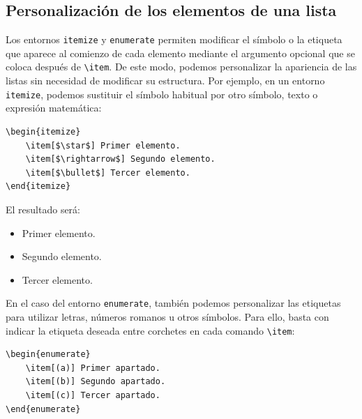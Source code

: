 \documentclass[11pt,a4paper]{article}
\theoremstyle{plain}
\theoremstyle{definition}
\theoremstyle{remark}
\theoremstyle{exercise}
\begin{document}
 
\subsection{Personalización de los elementos de una lista}

Los entornos \texttt{itemize} y \texttt{enumerate} permiten modificar el símbolo o la etiqueta que aparece al comienzo de cada elemento mediante el argumento opcional que se coloca después de \texttt{\textbackslash item}. De este modo, podemos personalizar la apariencia de las listas sin necesidad de modificar su estructura. Por ejemplo, en un entorno \texttt{itemize}, podemos sustituir el símbolo habitual por otro símbolo, texto o expresión matemática:

\begin{lstlisting}
\begin{itemize}
    \item[$\star$] Primer elemento.
    \item[$\rightarrow$] Segundo elemento.
    \item[$\bullet$] Tercer elemento.
\end{itemize}
\end{lstlisting}

\noindent El resultado será:

\begin{paginarecuadrada}
\begin{itemize}
    \item[$\star$] Primer elemento.
    \item[$\rightarrow$] Segundo elemento.
    \item[$\bullet$] Tercer elemento.
\end{itemize}
\end{paginarecuadrada}

En el caso del entorno \texttt{enumerate}, también podemos personalizar las etiquetas para utilizar letras, números romanos u otros símbolos. Para ello, basta con indicar la etiqueta deseada entre corchetes en cada comando \texttt{\textbackslash item}:

\begin{lstlisting}
\begin{enumerate}
    \item[(a)] Primer apartado.
    \item[(b)] Segundo apartado.
    \item[(c)] Tercer apartado.
\end{enumerate}
\end{lstlisting}
\end{document}
